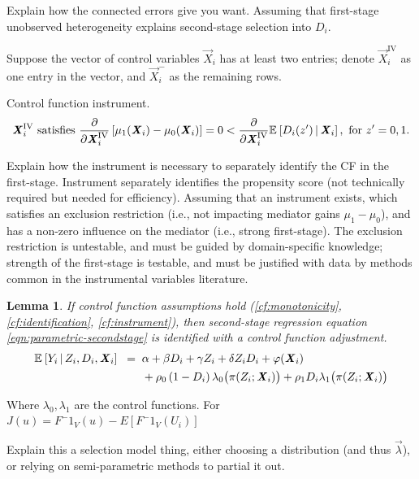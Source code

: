 Explain how the connected errors give you want.
Assuming that first-stage unobserved heterogeneity explains second-stage selection into $D_i$.

Suppose the vector of control variables $\vec X_i$ has at least two entries;
denote $\vec X_i^{\text{IV}}$ as one entry in the vector, and $\vec X_i^-$ as the remaining rows.
\begin{assumptionCF}
    \label{cf:instrument}
    Control function instrument.
    \[ \boldsymbol{\mathit{X}}_i^{\text{IV}} \textnormal{ satisfies }
    \frac{\partial}{\partial\boldsymbol{\mathit{X}}_i^{\text{IV}}}\left[
        \mu_1(\boldsymbol{\mathit{X}}_i) - \mu_0(\boldsymbol{\mathit{X}}_i)\right] = 0
        < \frac{\partial}{\partial\boldsymbol{\mathit{X}}_i^{\text{IV}}}\mathbb{E}_{} \left[ D_i(z') \, \middle\vert \, \boldsymbol{\mathit{X}}_i \right],
        \textnormal{ for } z' = 0, 1. \]
\end{assumptionCF}

Explain how the instrument is necessary to separately identify the CF in the first-stage.
Instrument separately identifies the propensity score (not technically required but needed for efficiency).
Assuming that an instrument exists, which satisfies an exclusion restriction (i.e., not impacting mediator gains $\mu_1-\mu_0$), and has a non-zero influence on the mediator (i.e., strong first-stage).
The exclusion restriction is untestable, and must be guided by domain-specific knowledge; strength of the first-stage is testable, and must be justified with data by methods common in the instrumental variables literature.

\newtheorem{lemma}{Lemma}
\begin{lemma}
    \label{lemma:secondstage}
    If control function assumptions hold (\ref{cf:monotonicity}, \ref{cf:identification}, \ref{cf:instrument}), then second-stage regression equation \eqref{eqn:parametric-secondstage} is identified with a control function adjustment.
    \begin{align*}
        \mathbb{E}_{} \left[ Y_i \, \middle\vert \, Z_i, D_i, \boldsymbol{\mathit{X}}_i \right] \;\; =& \;\;
            \alpha
            + \beta D_i
            + \gamma Z_i
            + \delta Z_i D_i
            + \varphi(\boldsymbol{\mathit{X}}_i) \\
            & \;\; +  \rho_0 \left( 1 - D_i \right) \lambda_0 \big( \pi(Z_i ; \boldsymbol{\mathit{X}}_i) \big)
                + \rho_1 D_i \lambda_1 \big( \pi(Z_i ; \boldsymbol{\mathit{X}}_i) \big)
    \end{align*}
\end{lemma}

Where $\lambda_0, \lambda_1$ are the control functions.
For $J(u) = F^-1_V(u) - E[ F^-1_V(U_i) ]$

Explain this a selection model thing, either choosing a distribution (and thus $\vec\lambda$), or relying on semi-parametric methods to partial it out.

